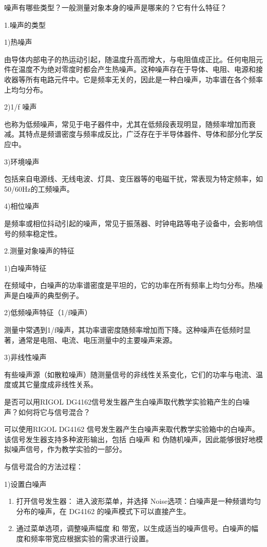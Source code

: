 \documentclass[dvipsnames, svgnames,a4paper,11pt]{article}
\begin{document}
		



	\begin{question}
	 噪声有哪些类型？一般测量对象本身的噪声是哪来的？它有什么特征？
	\end{question}
	1.噪声的类型

	1)热噪声

	由导体内部电子的热运动引起，随温度升高而增大，与电阻值成正比。任何电阻元件在温度不为绝对零度时都会产生热噪声。这种噪声存在于导体、电阻、电源和接收器等所有电路元件中。它是频率无关的，因此是一种白噪声，功率谱在各个频率上均匀分布。
	
	2)1/f 噪声
	
	也称为低频噪声，常见于电子器件中，尤其在低频段表现明显，随频率增加而衰减。其特点是频谱密度与频率成反比，广泛存在于半导体器件、导体和部分化学反应中。
	
	3)环境噪声

	包括来自电源线、无线电波、灯具、变压器等的电磁干扰，常表现为特定频率，如50/60Hz的工频噪声。

	4)相位噪声

	是频率或相位抖动引起的噪声，常见于振荡器、时钟电路等电子设备中，会影响信号的频率稳定性。

	2.测量对象噪声的特征

	1)白噪声特征

	在频域中，白噪声的功率谱密度是平坦的，它的功率在所有频率上均匀分布。热噪声是白噪声的典型例子。

	2)低频噪声特征（1/f噪声）

	测量中常遇到1/f噪声，其功率谱密度随频率增加而下降。这种噪声在低频时显著，通常是电阻、电流、电压测量中的主要噪声来源。

	3)非线性噪声

	有些噪声源（如散粒噪声）随测量信号的非线性关系变化，它们的功率与电流、温度或其它量度成非线性关系。


	\begin{question}
	是否可以用RIGOL DG4162信号发生器产生白噪声取代教学实验箱产生的白噪声？如何将它与信号混合？ 
	\end{question}
	可以使用RIGOL DG4162 信号发生器产生白噪声来取代教学实验箱中的白噪声。该信号发生器支持多种波形输出，包括 白噪声 和 伪随机噪声，因此能够很好地模拟噪声信号，作为教学实验的一部分。

	与信号混合的方法过程：
	
	1)设置白噪声
	\begin{enumerate}
		\item 打开信号发生器：	进入波形菜单，并选择 Noise选项：白噪声是一种频谱均匀分布的噪声，在 DG4162 的噪声模式下可以直接产生。
		\item 通过菜单选项，调整噪声幅度 和 带宽，以生成适当的噪声信号。白噪声的幅度和频率带宽应根据实验的需求进行设置。
	\end{enumerate}
    
\end{document}
